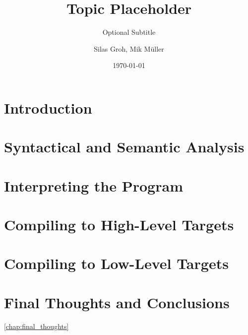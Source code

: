 



% 
% 


\titlehead{\centering\texttt{[image: pictures/title.png]}}
\title{Topic Placeholder}
\subtitle{Optional Subtitle}
\author{Silas Groh, Mik Müller}
\publishers{CFG Wuppertal}
\date{\today}


\maketitle

\tableofcontents

\cleardoublepage{}

\chapter{Introduction}




\chapter{Syntactical and Semantic Analysis}



\chapter{Interpreting the Program}



\chapter{Compiling to High-Level Targets}



\chapter{Compiling to Low-Level Targets}




\chapter{Final Thoughts and Conclusions}
\ref{chap:final_thoughts}

%

\listoffigures
\listoftables
{}
\nocite{*}
\printbibliography[heading=bibintoc]

